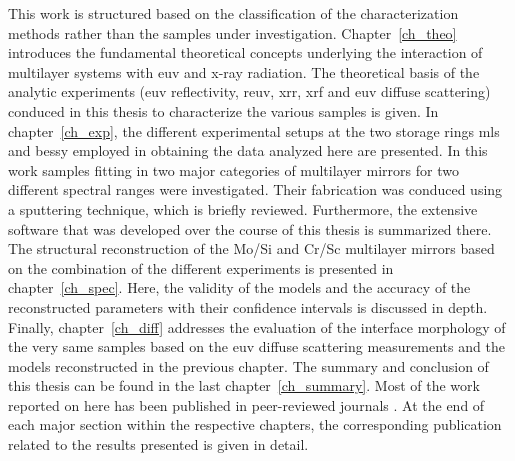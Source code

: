 This work is structured based on the classification of the characterization methods rather than the samples under investigation. Chapter~\ref{ch_theo} introduces the fundamental theoretical concepts underlying the interaction of multilayer systems with \gls{euv} and x-ray radiation. The theoretical basis of the analytic experiments (\gls{euv} reflectivity, \gls{reuv}, \gls{xrr}, \gls{xrf} and \gls{euv} diffuse scattering) conduced in this thesis to characterize the various samples is given. In chapter~\ref{ch_exp}, the different experimental setups at the two storage rings \gls{mls} and \gls{bessy} employed in obtaining the data analyzed here are presented. In this work samples fitting in two major categories of multilayer mirrors for two different spectral ranges were investigated. Their fabrication was conduced using a sputtering technique, which is briefly reviewed. Furthermore, the extensive software that was developed over the course of this thesis is summarized there. The structural reconstruction of the Mo/Si and Cr/Sc multilayer mirrors based on the combination of the different experiments is presented in chapter~\ref{ch_spec}. Here, the validity of the models and the accuracy of the reconstructed parameters with their confidence intervals is discussed in depth. Finally, chapter~\ref{ch_diff} addresses the evaluation of the interface morphology of the very same samples based on the \gls{euv} diffuse scattering measurements and the models reconstructed in the previous chapter. The summary and conclusion of this thesis can be found in the last chapter~\ref{ch_summary}. Most of the work reported on here has been published in peer-reviewed journals \cite{haase_role_2014, haase_multiparameter_2016, haase_interface_2017}. At the end of each major section within the respective chapters, the corresponding publication related to the results presented is given in detail.
% 
%  
% 
% 
% 
% 
% 
% 
% 
